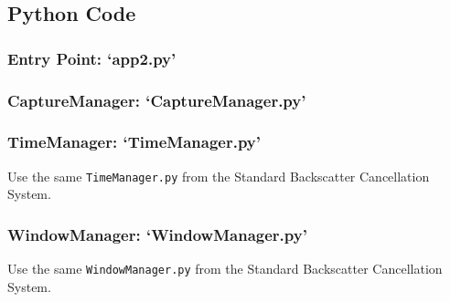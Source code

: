 \subsection{Python Code}
\label{sysmp_code}
\subsubsection{Entry Point: `app2.py'}



\subsubsection{CaptureManager: `CaptureManager.py'}



\subsubsection{TimeManager: `TimeManager.py'}
Use the same \texttt{TimeManager.py} from the Standard Backscatter Cancellation System.

\subsubsection{WindowManager: `WindowManager.py'}
Use the same \texttt{WindowManager.py} from the Standard Backscatter Cancellation System.
